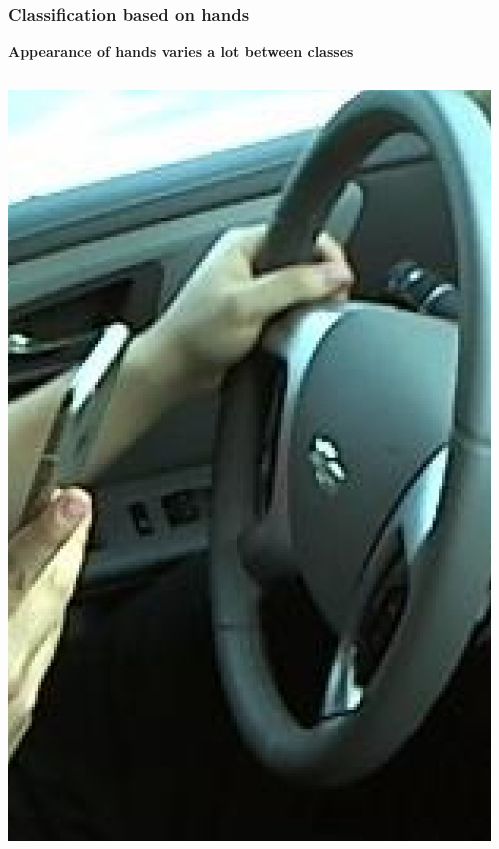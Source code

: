 \documentclass{beamer}
\begin{document}
	\begin{frame}
		\frametitle{Classification based on hands}
        \textbf{Appearance of hands varies a lot between classes}
		\begin{columns}
			\begin{column}{0.5\textwidth}
				\begin{center}
					\includegraphics[height=0.5\textheight]{handpose_example_1_cut}\\			
				\end{center}
			\end{column}
			\begin{column}{0.5\textwidth}
				\begin{center}

\end{center}
\end{column}
\end{columns}
\end{frame}
\end{document}
